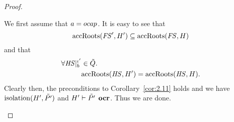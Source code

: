 \begin{proof}
\begin{description}
\begin{description}
          We first assume that $a = \mbox{$ocap$}$. It is easy to see that
          \begin{equation}
            \mbox{$\mathrm{accRoots}$}(\mathit{FS}', H') \subseteq \mbox{$\mathrm{accRoots}$}(\mathit{FS}, H)
          \end{equation}
          and that
          \begin{equation}
            \begin{aligned}
              \forall \mathit{HS}|_b^{\iota'} &\in \tilde{Q}. \\
              &\mbox{$\mathrm{accRoots}$}(\mathit{HS}, H') = \mbox{$\mathrm{accRoots}$}(\mathit{HS}, H).
            \end{aligned}
          \end{equation}
          Clearly then, the preconditions to Corollary~\ref{cor:2.11} holds and
          we have $\mbox{$\mathrm{isolation}$}(H', \tilde{P'})$ and $H' \vdash \tilde{P'} \:\:
          \mbox{\bf ocr}$. Thus we are done.


\end{description}
\end{description}
\end{proof}
